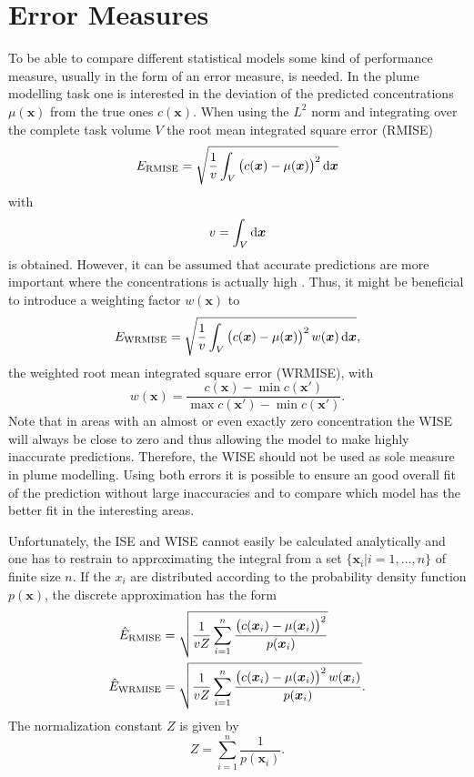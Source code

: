 \documentclass[11pt,a4paper]{scrreprt}
\newcommand{\vc}[1]{\bm{#1}}
\newcommand{\ped}[1]{_{\mathrm{#1}}}
\begin{document}
\chapter{Error Measures}
To be able to compare different statistical models some kind of performance 
measure, usually in the form of an error measure, is needed. In the plume 
modelling task one is interested in the deviation of the predicted 
concentrations $\mu(\vc x)$ from the true ones $c(\vc x)$. When using the $L^2$ 
norm and integrating over the complete task volume $V$ the root mean integrated 
square error (RMISE)
\begin{equation}
    E\ped{RMISE} = \sqrt{\frac{1}{v} \int_V \del{c(\vc x) - \mu(\vc x)}^2 
        \dif\vc x}
\end{equation}
with
\begin{equation}
    v = \int_V \dif\vc x
\end{equation}
is obtained. However, it can be assumed that accurate predictions are more 
important where the concentrations is actually high 
\parencite[c.p.][]{Marchant:2012wb}. Thus, it might be beneficial to introduce 
a weighting factor $w(\vc x)$ to
\begin{equation}
    E\ped{WRMISE} = \sqrt{\frac{1}{v} \int_V \del{c(\vc x) - \mu(\vc x)}^2 w(\vc 
        x) \dif\vc x} \text{,}
\end{equation}
the weighted root mean integrated square error (WRMISE), with
\begin{equation}
    w(\vc x) = \frac{c(\vc x) - \min c(\vc x')}{\max c(\vc x') - \min c(\vc x')} 
    \text{.}
\end{equation}
Note that in areas with an almost or even exactly zero concentration the WISE 
will always be close to zero and thus allowing the model to make highly 
inaccurate predictions. Therefore, the WISE should not be used as sole measure 
in plume modelling. Using both errors it is possible to ensure an good overall 
fit of the prediction without large inaccuracies and to compare which model has 
the better fit in the interesting areas.

Unfortunately, the ISE and WISE cannot easily be calculated analytically and one 
has to restrain to approximating the integral from a set $\{\vc x_i | i = 1, 
\dots, n\}$ of finite size $n$. If the $x_i$ are distributed according to the 
probability density function $p(\vc x)$, the discrete approximation has the form
\begin{align}
    \hat E\ped{RMISE} &= \sqrt{\frac{1}{vZ} \sum_{i=1}^n \frac{\del{c(\vc x_i) 
                - \mu(\vc x_i)}^2}{p(\vc x_i)}} \\
    \hat E\ped{WRMISE} &= \sqrt{\frac{1}{vZ} \sum_{i=1}^n \frac{\del{c(\vc x_i) 
                - \mu(\vc x_i)}^2 w(\vc x_i)}{p(\vc x_i)}} \text{.}
\end{align}
The normalization constant $Z$ is given by
\begin{equation}
    Z = \sum_{i=1}^n \frac{1}{p(\vc x_i)} \text{.}
\end{equation}
\end{document}
